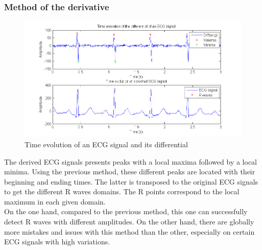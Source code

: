 \documentclass[11pt]{article}
\begin{document}
		\subsubsection{Method of the derivative}
			\begin{figure}[ht]
				\centering
				\includegraphics[scale=0.5]{images/Q411_d.png}
				\caption{Time evolution of an ECG signal and its differential}
				\label{Q411_d}
			\end{figure}
			The derived ECG signals presents peaks with a local maxima followed by a local minima. Using the previous method, these different peaks are located with their beginning and ending times. The latter is transposed to the original ECG signals to get the different R waves domains. The R points correspond to the local maximum in each given domain.\\
			On the one hand, compared to the previous method, this one can successfully detect R waves with different amplitudes. On the other hand, there are globally more mistakes and issues with this method than the other, especially on certain ECG signals with high variations.\\
\end{document}
